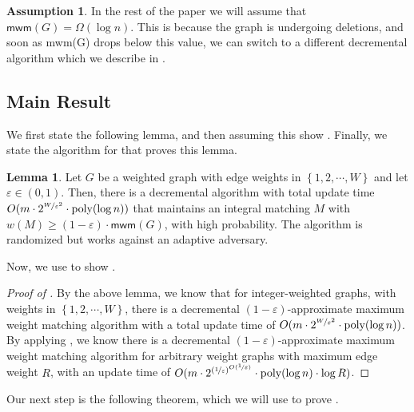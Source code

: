 \documentclass[a4paper,11pt]{article}
\newcommand{\set}[1]{\ensuremath{\left\{ #1 \right\}}}
\newcommand{\poly}{\mbox{\rm poly}}
\newcommand{\eps}{\varepsilon}
\theoremstyle{definition}
\theoremstyle{definition}
\theoremstyle{definition}
\theoremstyle{definition}
\theoremstyle{definition}
\newtheorem{lemma2}[definition2]{Lemma}
\theoremstyle{definition}
\theoremstyle{definition}
\theoremstyle{definition}
\theoremstyle{definition}
\theoremstyle{definition}
\theoremstyle{definition}
\theoremstyle{definition}
\theoremstyle{definition}
\theoremstyle{definition}
\newtheorem{assumption}[definition2]{Assumption}
\theoremstyle{definition}
\begin{document}
\begin{assumption}\label{assumption:largematching}
In the rest of the paper we will assume that $\textsf{mwm}(G)=\Omega(\log n)$. This is because the graph is undergoing deletions, and soon as \textsf{mwm}(G) drops below this value, we can switch to a different decremental algorithm which we describe in .
\end{assumption}

\subsection*{Main Result}

We first state the following lemma, and then assuming this show . Finally, we state the algorithm for that proves this lemma. 

\begin{lemma2}\label{lem:intermmain}
Let $G$ be a weighted graph with edge weights in $\set{1,2,\cdots, W}$ and let $\eps\in (0,1)$. Then, there is a decremental algorithm with total update time $O(m\cdot 2^{\nicefrac{W}{\eps^2}}\cdot \poly(\log n))$ that maintains an integral matching $M$ with $w(M)\geqslant (1-\eps)\cdot \textsf{mwm}(G)$, with high probability. The algorithm is randomized but works against an adaptive adversary. 
\end{lemma2}

Now, we use  to show .

\begin{proof}[Proof of ]
By the above lemma, we know that for integer-weighted graphs, with weights in $\set{1,2,\cdots, W}$, there is a decremental $(1-\eps)$-approximate maximum weight matching algorithm with a total update time of $O(m\cdot 2^{\nicefrac{W}{\eps^2}}\cdot \poly(\log n))$. By applying , we know there is a decremental $(1-\eps)$-approximate maximum weight matching algorithm for arbitrary weight graphs with maximum edge weight $R$, with an update time of $O(m\cdot 2^{(\nicefrac{1}{\eps})^{O(\nicefrac{1}{\eps})}}\cdot\poly(\log n)\cdot\log R)$. 
\end{proof}

Our next step is the following theorem, which we will use to prove .
\end{document}

